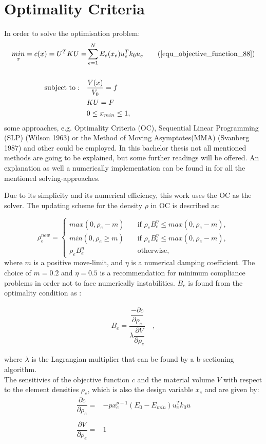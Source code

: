 \section{Optimality Criteria}
\label{section_OC}
In order to solve the optimisation problem:
\begin{align}
\underset{x}{min} = c (x) = U^TKU = \displaystyle &\sum_{e = 1}^N E_e(x_e)u_e^Tk_0u_e 
\tag{\ref{equ_objective_function_88}}\\
\nonumber \\ \nonumber 
 \text{subject to}: \quad &\frac{V(x)}{V_0} = f \\\nonumber
& KU = F\\\nonumber
& 0\leq x_{min} \leq1, \nonumber
\end{align}
some approaches, e.g. Optimality Criteria (OC), Sequential Linear Programming (SLP) (Wilson 1963) or the Method of Moving Asymptotes(MMA) (Svanberg 1987) and other could be employed.
 In this bachelor thesis not all mentioned methods are
  going to be explained, but some further readings will be offered. An
   explanation as well a numerically implementation can be found in \cite{Liu.2014} for all the
   mentioned solving-approaches.

Due to its simplicity and its numerical efficiency, this work 
uses the OC \cite{Bendse.2004} as the solver. 
The updating scheme for the density \textbf{$\rho$} in OC is described as:

\[ \rho_e^{new} =
 \begin{cases}
 max (0, \rho_e - m) & \quad \text{if } \rho_e B_e^{\eta} \leq max(0, \rho_e - m), \\
 min (0, \rho_e \geq m) & \quad \text{if } \rho_e B_e^\eta \leq max(0, \rho_e - m), \\
 \rho_e B_e^{\eta}&\quad \text{otherwise,}
 \end{cases}
\]
where \textbf{$m$ }is a positive move-limit, and \textbf{$\eta$} is a numerical damping coefficient. The choice of $m = 0.2$ and $\eta = 0.5$ is a recommendation for minimum compliance problems \cite{Bendse.2004} in order not to face numerically instabilities. \textbf{$B_e$} is found from the optimality condition as :

\begin{align}
B_e = \dfrac{\dfrac{-\partial c}{\partial \rho_e}}{\displaystyle\lambda \dfrac{\partial V}{\partial\rho_e}} \quad,
\label{equ_opti_condition}
\end{align}

where \textbf{$\lambda$} is the Lagrangian multiplier that can be found by a b-sectioning algorithm. \\
The sensitivies of the objective function \textbf{$c$} and the material volume \textbf{$V$} with respect to the element densities $\rho_e$, which is also the design variable \textbf{$x_e$} and are given by:
\begin{align}
\dfrac{\partial c}{\partial \rho_e} =& -p x_e^{p-1} (E_0-E_{min})u_e^Tk_0u\\ \nonumber\\
\dfrac{\partial V}{\partial \rho_e} =& 1
\end{align}

